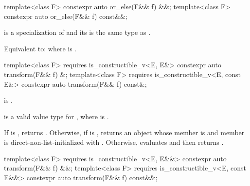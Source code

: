 %
\begin{itemdecl}
template<class F> constexpr auto or_else(F&& f) &&;
template<class F> constexpr auto or_else(F&& f) const&&;
\end{itemdecl}

\begin{itemdescr}
\pnum
\mandates
{} is a specialization of  and its  is the same type as .

\pnum
\effects
Equivalent to:  where  is .
\end{itemdescr}

%
\begin{itemdecl}
template<class F>
  requires is_constructible_v<E, E&>
constexpr auto transform(F&& f) &;
template<class F>
  requires is_constructible_v<E, const E&>
constexpr auto transform(F&& f) const&;
\end{itemdecl}

\begin{itemdescr}
\pnum
\constraints
{} is .

\pnum
\mandates
{} is a valid value type for , where  is .

\pnum
\effects
If  is , returns . Otherwise, if  is , returns an  object whose  member is  and  member is direct-non-list-initialized with . Otherwise, evaluates  and then returns .
\end{itemdescr}

%
\begin{itemdecl}
template<class F>
  requires is_constructible_v<E, E&&>
constexpr auto transform(F&& f) &&;
template<class F>
  requires is_constructible_v<E, const E&&>
constexpr auto transform(F&& f) const&&;
\end{itemdecl}

